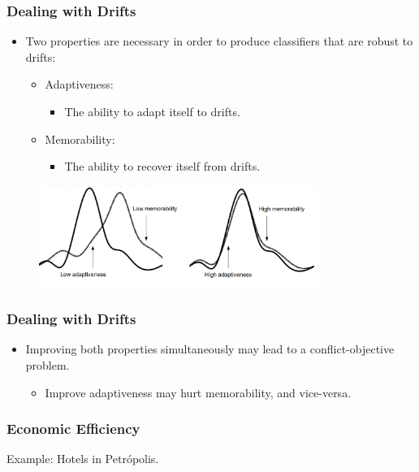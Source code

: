 \documentclass[14pt]{beamer}
\begin{document}
\begin{frame}\frametitle{Dealing with Drifts}

\begin{itemize}
\item Two properties are necessary in order to produce classifiers that are robust to drifts:
\begin{itemize}
\item Adaptiveness:
\begin{itemize}
\item The ability to adapt itself to drifts.
\end{itemize}
\item Memorability:
\begin{itemize}
\item The ability to recover itself from drifts.
\end{itemize}
\end{itemize}
\end{itemize}

\begin{figure}
\centering
\includegraphics[height=1.30in]{drift3}
\end{figure}
\end{frame}

\begin{frame}\frametitle{Dealing with Drifts}

\begin{itemize}
\item Improving both properties simultaneously may lead to a conflict-objective problem.
\begin{itemize}
\item Improve adaptiveness may hurt memorability, and vice-versa.
\end{itemize}
\end{itemize}

\end{frame}


\begin{frame}\frametitle{Economic Efficiency}

Example: Hotels in Petr\'{o}polis.

\centering


\end{frame}
\end{document}
